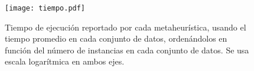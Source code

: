 \begin{figure}[h!]
\centering
\texttt{[image: tiempo.pdf]}
\caption[Tiempo de ejecución de cada metaheurística]{Tiempo de ejecución reportado por cada metaheurística, usando el tiempo promedio en cada conjunto de datos, ordenándolos en función del número de instancias en cada conjunto de datos. Se usa escala logarítmica en ambos ejes.}
\label{fig-tiempo}
\end{figure}
